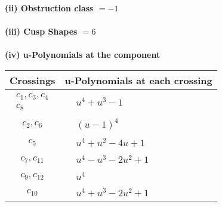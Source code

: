 \documentclass[1p]{elsarticle_modified}
\theoremstyle{definition}
\begin{document}
\flushleft \textbf{(ii) Obstruction class $= -1$}\\~\\
\flushleft \textbf{(iii) Cusp Shapes $= 6$}\\~\\
\newpage\renewcommand{\arraystretch}{1}
\flushleft \textbf{(iv) u-Polynomials at the component}\newline \\
\begin{tabular}{m{50pt}|m{274pt}}
Crossings & \hspace{64pt}u-Polynomials at each crossing \\
\hline $$\begin{aligned}c_{1},c_{3},c_{4}\\c_{8}\end{aligned}$$&$\begin{aligned}
&u^4+u^3-1
\end{aligned}$\\
\hline $$\begin{aligned}c_{2},c_{6}\end{aligned}$$&$\begin{aligned}
&(u-1)^4
\end{aligned}$\\
\hline $$\begin{aligned}c_{5}\end{aligned}$$&$\begin{aligned}
&u^4+u^2-4 u+1
\end{aligned}$\\
\hline $$\begin{aligned}c_{7},c_{11}\end{aligned}$$&$\begin{aligned}
&u^4- u^3-2 u^2+1
\end{aligned}$\\
\hline $$\begin{aligned}c_{9},c_{12}\end{aligned}$$&$\begin{aligned}
&u^4
\end{aligned}$\\
\hline $$\begin{aligned}c_{10}\end{aligned}$$&$\begin{aligned}
&u^4+u^3-2 u^2+1
\end{aligned}$\\
\hline
\end{tabular}\\~\\
\end{document}
